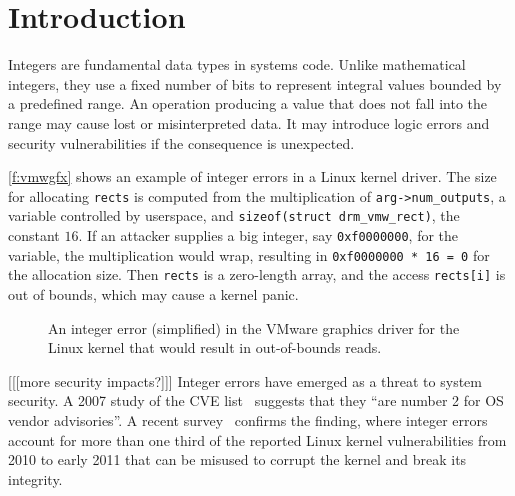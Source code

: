 \section{Introduction}
\label{s:intro}

Integers are fundamental data types in systems code.  Unlike
mathematical integers, they use a fixed number of bits to represent
integral values bounded by a predefined range.  An operation producing
a value that does not fall into the range may cause lost or
misinterpreted data.  It may introduce logic errors and security
vulnerabilities if the consequence is unexpected.

\autoref{f:vmwgfx} shows an example of integer errors in a Linux
kernel driver.  The size for allocating \lstinline!rects! is computed
from the multiplication of \lstinline!arg->num_outputs!, a variable
controlled by userspace, and \lstinline!sizeof(struct drm_vmw_rect)!,
the constant $16$.  If an attacker supplies a big integer, say
\lstinline!0xf0000000!, for the variable, the multiplication would
wrap, resulting in \lstinline!0xf0000000 * 16 = 0! for the allocation
size.  Then \lstinline!rects! is a zero-length array, and the access
\lstinline!rects[i]! is out of bounds, which may cause a kernel
panic.

\begin{figure}[h]

\caption{An integer error (simplified) in the VMware graphics driver
for the Linux kernel that would result in out-of-bounds reads.}
\label{f:vmwgfx}
\end{figure}

[[[more security impacts?]]]
Integer errors have emerged as a threat to system security.  A 2007
study of the CVE list~\cite{christey:vuln} suggests that they ``are
number 2 for OS vendor advisories''.  A recent survey~\cite{chen:kbugs}
confirms the finding, where integer errors account for more than
one third of the reported Linux kernel vulnerabilities from 2010
to early 2011 that can be misused to corrupt the kernel and break
its integrity.

